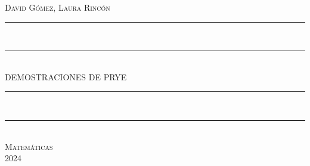 \documentclass{article}
\newcommand*{\titleTMB}{\begingroup
\def\drop{0.1\textheight}
\centering
\vspace*{\baselineskip}
{\large\scshape David Gómez, Laura Rincón}\\[\baselineskip]
\rule{\textwidth}{1.6pt}\\[0pt]
\vspace*{-\baselineskip}
\vspace*{2pt}
\rule{\textwidth}{0.4pt}\\[\baselineskip]
{\LARGE DEMOSTRACIONES DE PRYE}\\[\baselineskip]
\rule{\textwidth}{0.4pt}\\[0pt]
\vspace*{-\baselineskip}\vspace{3.2pt}
\rule{\textwidth}{1.6pt}\\[\baselineskip]
\vfill
{\large\scshape Matemáticas}\\[\baselineskip]
{\small\scshape 2024}\par
\vspace*{\drop}
\endgroup}
\begin{document}
\begin{titlepage}
  \titleTMB
\end{titlepage}
\tableofcontents
\clearpage






\nocite{LilianaBlanco}
\printbibliography
\end{document}
